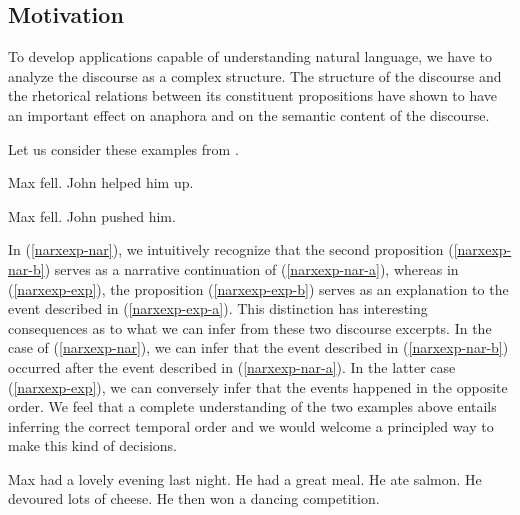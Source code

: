 \subsection{Motivation}

To develop applications capable of understanding natural language, we
have to analyze the discourse as a complex structure. The structure of
the discourse and the rhetorical relations between its constituent
propositions have shown to have an important effect on anaphora and on
the semantic content of the discourse.

Let us consider these examples from \cite{asher2003logics}.

\begin{exe}
  \ex \label{narxexp-nar} \begin{xlist}
    \ex \label{narxexp-nar-a} Max fell.
    \ex \label{narxexp-nar-b} John helped him up.
  \end{xlist}
  \ex \label{narxexp-exp} \begin{xlist}
    \ex \label{narxexp-exp-a} Max fell.
    \ex \label{narxexp-exp-b} John pushed him.
  \end{xlist}
\end{exe}

In (\ref{narxexp-nar}), we intuitively recognize that the second
proposition (\ref{narxexp-nar-b}) serves as a narrative continuation of
(\ref{narxexp-nar-a}), whereas in (\ref{narxexp-exp}), the proposition
(\ref{narxexp-exp-b}) serves as an explanation to the event described in
(\ref{narxexp-exp-a}). This distinction has interesting consequences as
to what we can infer from these two discourse excerpts. In the case of
(\ref{narxexp-nar}), we can infer that the event described in
(\ref{narxexp-nar-b}) occurred after the event described in
(\ref{narxexp-nar-a}). In the latter case (\ref{narxexp-exp}), we can
conversely infer that the events happened in the opposite order. We feel
that a complete understanding of the two examples above entails
inferring the correct temporal order and we would welcome a principled
way to make this kind of decisions.

\begin{exe}
  \ex \label{salmon} \begin{xlist}
    \ex Max had a lovely evening last night.
    \ex He had a great meal.
    \ex \label{salmon-here} He ate salmon.
    \ex He devoured lots of cheese.
    \ex He then won a dancing competition.
  \end{xlist}
\end{exe}

